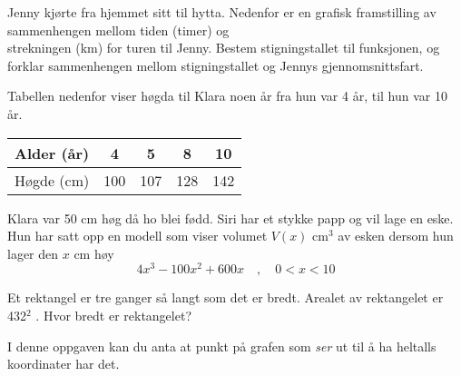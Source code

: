 Jenny kjørte fra hjemmet sitt til hytta. Nedenfor er en grafisk framstilling av sammenhengen
mellom tiden (timer) og \\ strekningen (km) for turen til Jenny. \vs
{}
Bestem stigningstallet til funksjonen, og forklar sammenhengen mellom stigningstallet og Jennys gjennomsnittsfart.

Tabellen nedenfor viser høgda til Klara noen år fra hun var 4 år, til hun var 10 år.
\begin{center}
	\begin{tabular}{|c|c|c|c|c|}
		\hline
		Alder (år) & 4 & 5 & 8 & 10 \\ \hline
		Høgde (cm) & 100 & 107 & 128 & 142\\
		\hline
	\end{tabular}
\end{center}
Klara var 50 cm høg då ho blei fødd.
\newpage
{}
Siri har et stykke papp og vil lage en eske. Hun har satt opp en modell som viser
volumet $ V(x) $ cm$ ^3 $ av esken dersom hun lager den $ x $ cm høy
\[ 4x^3-100x^2+600x\quad,\quad 0<x<10\]

Et rektangel er tre ganger så langt som det er bredt. Arealet av rektangelet er 432$ ^2 $ .\os
Hvor bredt er rektangelet?

\newpage
{}
I denne oppgaven kan du anta at punkt på grafen som \textit{ser} ut til å ha heltalls koordinater har det.


